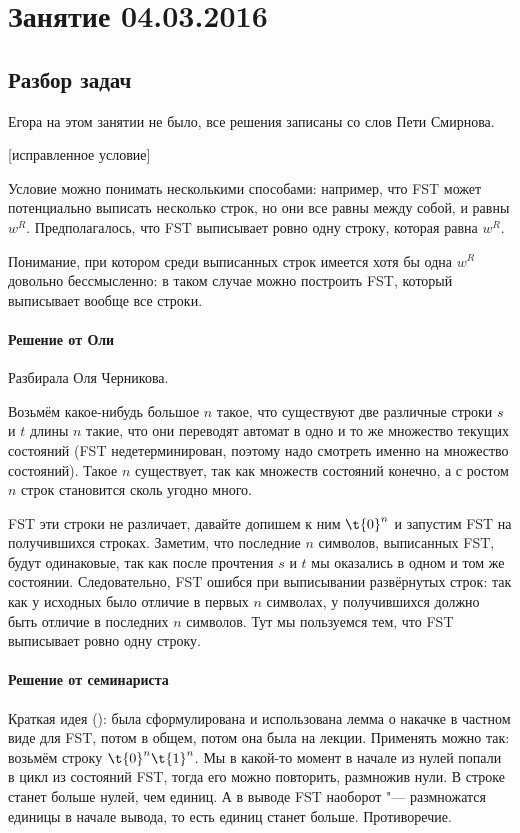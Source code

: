 \chapter{Занятие 04.03.2016}
\section{Разбор задач}

Егора на этом занятии не было, все решения записаны со слов Пети Смирнова.

[исправленное условие]\label{prob11hard}
	\begin{Rem}
		Условие можно понимать несколькими способами: например, что FST может потенциально выписать 
		несколько строк, но они все равны между собой, и равны $w^R$.
		Предполагалось, что FST выписывает ровно одну строку, которая равна $w^R$.

		Понимание, при котором среди выписанных строк имеется хотя бы одна $w^R$ довольно бессмысленно:
		в таком случае можно построить FST, который выписывает вообще все строки.
	\end{Rem}

	\subsubsection{Решение от Оли}
		Разбирала Оля Черникова.

		Возьмём какое-нибудь большое $n$ такое, что существуют две различные строки $s$ и $t$ длины $n$ такие,
		что они переводят автомат в одно и то же множество текущих состояний (FST недетерминирован, поэтому надо смотреть именно на множество состояний).
		Такое $n$ существует, так как множеств состояний конечно, а с ростом $n$ строк становится сколь угодно много.

		FST эти строки не различает, давайте допишем к ним $\t{0}^n$ и запустим FST на получившихся строках.
		Заметим, что последние $n$ символов, выписанных FST, будут одинаковые, так как после прочтения $s$ и $t$
		мы оказались в одном и том же состоянии.
		Следовательно, FST ошибся при выписывании развёрнутых строк: так как у исходных было отличие в первых $n$
		символах, у получившихся должно быть отличие в последних $n$ символов.
		Тут мы пользуемся тем, что FST выписывает ровно одну строку.

	\subsubsection{Решение от семинариста}
		Краткая идея (\TODO):
		была сформулирована и использована лемма о накачке в частном виде для FST, потом в общем, потом она была на лекции.
		Применять можно так: возьмём строку $\t{0}^n\t{1}^n$.
		Мы в какой-то момент в начале из нулей попали в цикл из состояний FST, тогда его можно повторить, размножив нули.
		В строке станет больше нулей, чем единиц.
		А в выводе FST наоборот "--- размножатся единицы в начале вывода, то есть единиц станет больше.
		Противоречие.

